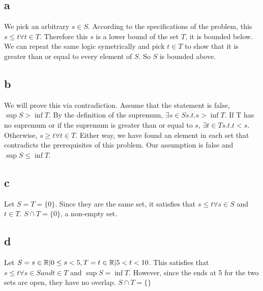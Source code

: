 \documentclass[12pt]{article}
\begin{document}
\subsection{a}
We pick an arbitrary $s \in S$. According to the specifications of the problem, this $s \leq t \forall t \in T$. Therefore this $s$ is a lower bound of the set $T$, it is bounded below.
\newline
We can repeat the same logic symetrically and pick $t \in T$ to show that it is greater than or equal to every element of $S$. So $S$ is bounded above.

\subsection{b}
We will prove this via contradiction. Assume that the statement is false, $\sup S > \inf T$. By the definition of the supremum, $\exists s \in S s.t. s > \inf T$. If T has no supremum or if the supremum is greater than or equal to $s$, $\exists t \in T s.t. t < s$. Otherwise, $s \geq t \forall t \in T$. Either way, we have found an element in each set that contradicts the prerequisites of this problem.
\newline
Our assumption is false and $\sup S \leq \inf T$.

\subsection{c}
Let $S = T = \{ 0 \}$. Since they are the same set, it satisfies that $s \leq t \forall s \in S$ and $t \in T$. $S \cap T = \{0\}$, a non-empty set.

\subsection{d}
Let $S = {s \in \mathbb{R} | 0 \leq s < 5}, T = {t \in \mathbb{R} | 5 < t < 10}$. This satisfies that $s \leq t \forall s \in S and t \in T$ and $\sup S = \inf T$. However, since the ends at 5 for the two sets are open, they have no overlap. $S \cap T = \{\}$


\newpage
\end{document}
